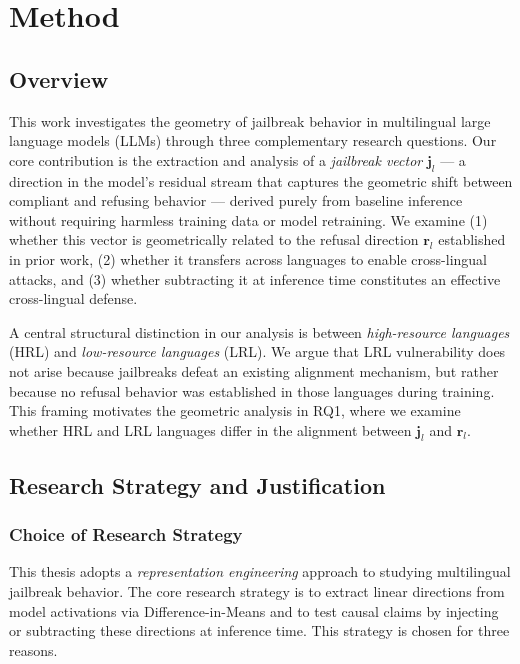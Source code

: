 \chapter{Method}
\label{chap:method}

\section{Overview}
\label{sec:overview}

This work investigates the geometry of jailbreak behavior in multilingual large language models (LLMs) through three complementary research questions. Our core contribution is the extraction and analysis of a \textit{jailbreak vector} $\mathbf{j}_l$ — a direction in the model's residual stream that captures the geometric shift between compliant and refusing behavior — derived purely from baseline inference without requiring harmless training data or model retraining. We examine (1) whether this vector is geometrically related to the refusal direction $\mathbf{r}_l$ established in prior work, (2) whether it transfers across languages to enable cross-lingual attacks, and (3) whether subtracting it at inference time constitutes an effective cross-lingual defense.

A central structural distinction in our analysis is between \textit{high-resource languages} (HRL) and \textit{low-resource languages} (LRL). We argue that LRL vulnerability does not arise because jailbreaks defeat an existing alignment mechanism, but rather because no refusal behavior was established in those languages during training. This framing motivates the geometric analysis in RQ1, where we examine whether HRL and LRL languages differ in the alignment between $\mathbf{j}_l$ and $\mathbf{r}_l$.

\section{Research Strategy and Justification}
\label{sec:strategy}

\subsection{Choice of Research Strategy}

This thesis adopts a \textit{representation engineering} approach to studying multilingual jailbreak behavior. The core research strategy is to extract linear directions from model activations via Difference-in-Means and to test causal claims by injecting or subtracting these directions at inference time. This strategy is chosen for three reasons.

